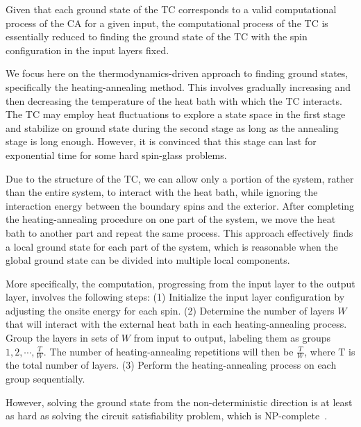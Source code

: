 \documentclass[twocolumn,superscriptaddress,english,showpacs,longbibliography]{revtex4-2}
\begin{document}
Given that each ground state of the TC corresponds to a valid computational process of the CA for a given input, the computational process of the TC is essentially reduced to finding the ground state of the TC with the spin configuration in the input layers fixed.

We focus here on the thermodynamics-driven approach to finding ground states, specifically the heating-annealing method. This involves gradually increasing and then decreasing the temperature of the heat bath with which the TC interacts. The TC may employ heat fluctuations to explore a state space in the first stage and stabilize on ground state during the second stage as long as the annealing stage is long enough. However, it is convinced that this stage can last for exponential time for some hard spin-glass problems.

Due to the structure of the TC, we can allow only a portion of the system, rather than the entire system, to interact with the heat bath, while ignoring the interaction energy between the boundary spins and the exterior. After completing the heating-annealing procedure on one part of the system, we move the heat bath to another part and repeat the same process. This approach effectively finds a local ground state for each part of the system, which is reasonable when the global ground state can be divided into multiple local components.

More specifically, the computation, progressing from the input layer to the output layer, involves the following steps: (1) Initialize the input layer configuration by adjusting the onsite energy for each spin. (2) Determine the number of layers $W$ that will interact with the external heat bath in each heating-annealing process. Group the layers in sets of $W$ from input to output, labeling them as groups $1, 2, \cdots, \frac{T}{W}$. The number of heating-annealing repetitions will then be $\frac{T}{W}$, where T is the total number of layers. (3) Perform the heating-annealing process on each group sequentially.

However, solving the ground state from the non-deterministic direction is at least as hard as solving the circuit satisfiability problem, which is NP-complete~\cite{Moore2011}.

\end{document}
